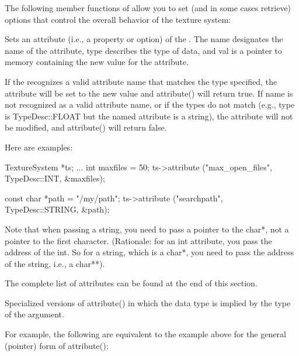 The following member functions of \TextureSystem allow you to set
(and in some cases retrieve) options that control the overall
behavior of the texture system:


Sets an attribute (i.e., a property or option) of the \TextureSystem.
The {\cf name} designates the name of the attribute, {\cf type}
describes the type of data, and {\cf val} is a pointer to memory 
containing the new value for the attribute.

If the \TextureSystem recognizes a valid attribute name that matches the
type specified, the attribute will be set to the new value and {\cf
  attribute()} will return {\cf true}.  If {\cf name} is not recognized
as a valid attribute name, or if the types do not match (e.g., {\cf
  type} is {\cf TypeDesc::FLOAT} but the named attribute is a string),
the attribute will not be modified, and {\cf attribute()} will return
{\cf false}.

Here are examples:

\begin{code}
      TextureSystem *ts; 
      ...
      int maxfiles = 50;
      ts->attribute ("max_open_files", TypeDesc::INT, &maxfiles);

      const char *path = "/my/path";
      ts->attribute ("searchpath", TypeDesc::STRING, &path);
\end{code}

Note that when passing a string, you need to pass a pointer to the {\cf
  char*}, not a pointer to the first character.  (Rationale: for an {\cf
  int} attribute, you pass the address of the {\cf int}.  So for a
string, which is a {\cf char*}, you need to pass the address of the
string, i.e., a {\cf char**}).

The complete list of attributes can be found at the end of this section.

\apiend

Specialized versions of {\cf attribute()} in which the data type is
implied by the type of the argument.

For example, the following are equivalent to the example above for the
general (pointer) form of {\cf attribute()}:

